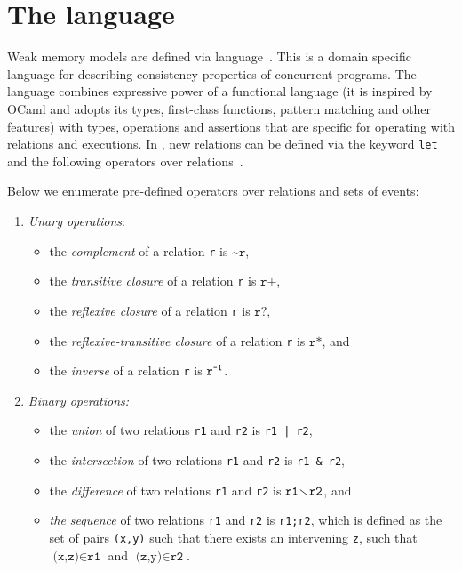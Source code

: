\section{The \cat{} language}
\label{ch:wmm:cat}

Weak memory models are defined via \cat{} language~\cite{alglave2016syntax}.
This is a domain specific language for describing consistency properties of concurrent programs.
The language combines expressive power of a functional language (it is inspired by OCaml and adopts its types, first-class functions, pattern matching and other features) with types, operations and assertions that are specific for operating with relations and executions.
In \cat{}, new relations can be defined via the keyword \texttt{let} and the following operators over relations~\cite{alglave2016syntax}. %


Below we enumerate pre-defined operators over relations and sets of events:

\begin{enumerate}
  \item \textit{Unary operations}:
    \begin{itemize}
      \item the \textit{complement} of a relation \texttt{r} is $\texttt{\textasciitilde r}$,
      \item the \textit{transitive closure} of a relation \texttt{r} is $\texttt{r+}$,
      \item the \textit{reflexive closure} of a relation \texttt{r} is $\texttt{r?}$,
      \item the \textit{reflexive-transitive closure} of a relation \texttt{r} is $\texttt{r*}$, and
      \item the \textit{inverse} of a relation \texttt{r} is $\texttt{r}^{\texttt{-1}}$.
    \end{itemize}
  \item \textit{Binary operations:}
  \begin{itemize}
    \item the \textit{union} of two relations \texttt{r1} and \texttt{r2} is \texttt{r1\,|\,r2},
    \item the \textit{intersection} of two relations \texttt{r1} and \texttt{r2} is \texttt{r1\,\&\,r2},
      \item the \textit{difference} of two relations \texttt{r1} and \texttt{r2} is $\texttt{r1} \!\smallsetminus\! \texttt{r2}$, and
    \item \textit{the sequence} of two relations \texttt{r1} and \texttt{r2} is \texttt{r1;r2}, which is defined as the set of pairs \texttt{(x,y)} such that there exists an intervening \texttt{z}, such that $\texttt{(x,z)} \in \texttt{r1}$ and $\texttt{(z,y)} \in \texttt{r2}$.
  \end{itemize}
\end{enumerate}

